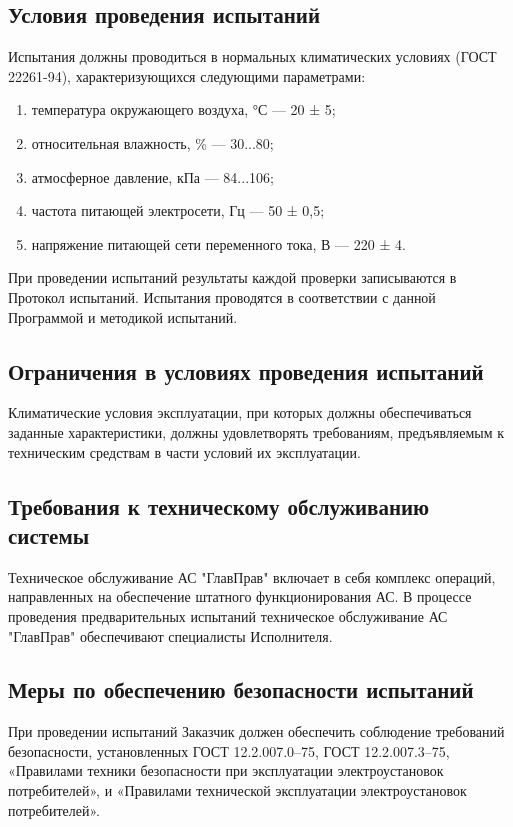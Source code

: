 \documentclass[russian, utf8, 12pt,pointsubsection,floatsubsection]{eskdtext}
\begin{document}
\subsection{Условия проведения испытаний}
Испытания должны проводиться в нормальных климатических условиях (ГОСТ 22261-94), характеризующихся следующими параметрами:
\begin{enumerate}
    \item температура окружающего воздуха, °С — 20 ± 5;
    \item относительная влажность, \% — 30...80;
    \item атмосферное давление, кПа — 84...106;
    \item частота питающей электросети, Гц — 50 ± 0,5;
    \item напряжение питающей сети переменного тока, В — 220 ± 4.
\end{enumerate}

При проведении испытаний результаты каждой проверки записываются в Протокол испытаний. Испытания проводятся в соответствии с данной Программой и методикой испытаний.

\subsection{Ограничения в условиях проведения испытаний}
Климатические условия эксплуатации, при которых должны обеспечиваться заданные характеристики, должны удовлетворять требованиям, предъявляемым к техническим средствам в части условий их эксплуатации.

\subsection{Требования к техническому обслуживанию системы}
Техническое обслуживание АС "ГлавПрав" включает в себя комплекс операций, направленных на обеспечение штатного функционирования АС. В процессе проведения предварительных испытаний техническое обслуживание АС "ГлавПрав" обеспечивают специалисты Исполнителя.

\subsection{Меры по обеспечению безопасности испытаний}
При проведении испытаний Заказчик должен обеспечить соблюдение требований безопасности, установленных ГОСТ 12.2.007.0–75, ГОСТ 12.2.007.3–75, «Правилами техники безопасности при эксплуатации электроустановок потребителей», и «Правилами технической эксплуатации электроустановок потребителей».
\end{document}
